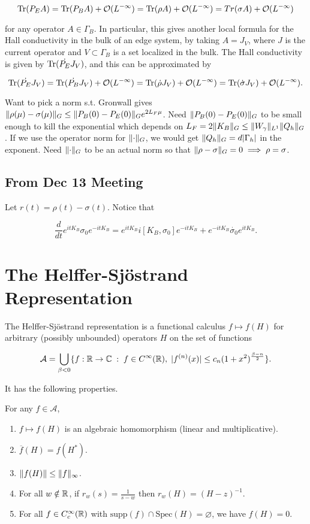 \documentclass[12pt, letterpaper]{article}
\begin{document}
\[\text{Tr}(P_E A) = \text{Tr}(P_B A) + \mathcal{O}(L^{-\infty}) = \text{Tr}(\rho A) + \mathcal{O}(L^{-\infty}) = Tr(\sigma A) + \mathcal{O}(L^{-\infty}) \]

for any operator $A\in\Gamma_B$. In particular, this gives another local formula for the Hall conductivity in the bulk of an edge system, by taking $A = J_V$, where $J$ is the current operator and $V \subset \Gamma_B$ is a set localized in the bulk. The Hall conductivity is given by $\text{Tr}(\dot{P_E}J_V)$, and this can be approximated by

\[\text{Tr}(\dot{P_E} J_V) = \text{Tr}(\dot{P_B} J_V) + \mathcal{O}(L^{-\infty}) = \text{Tr}(\dot{\rho} J_V) + \mathcal{O}(L^{-\infty}) = \text{Tr}(\dot{\sigma} J_V) + \mathcal{O}(L^{-\infty}).\]

Want to pick a norm s.t. Gronwall gives $\lVert \rho(\mu)-\sigma(\mu) \rVert_G \leq \lVert P_B(0)-P_E(0) \rVert_Ge^{2L_F\mu}$. Need $\lVert P_B(0)-P_E(0) \rVert_G$ to be small enough to kill the exponential which depends on $L_F = 2\lVert K_B \rVert_G \leq \lVert W_\gamma \rVert_{L^1}\lVert Q_h \rVert_G$. If we use the operator norm for $\lVert \cdot \rVert_G$, we would get $\lVert Q_h \rVert_G = d|\Gamma_h|$ in the exponent. Need $\lVert \cdot \rVert_G$ to be an actual norm so that $\lVert \rho-\sigma \rVert_G = 0 \implies \rho = \sigma$.

\subsection*{From Dec 13 Meeting}

Let $r(t) = \rho(t)-\sigma(t)$. Notice that 

\[\frac{d}{dt} e^{itK_B}\sigma_0e^{-itK_B} = e^{itK_B}i[K_B,\sigma_0]e^{-itK_B} + e^{-itK_B}\dot{\sigma_0}e^{itK_B}.\]

\section{The Helffer-Sj\"{o}strand Representation}

The Helffer-Sj\"{o}strand representation is a functional calculus $f \mapsto f(H)$ for arbitrary (possibly unbounded) operators $H$ on the set of functions 

\[\mathcal{A} = \bigcup_{\beta<0} \{f:\mathbb{R}\to\mathbb{C} \; : \; f \in C^\infty(\mathbb{R}), \; |f^{(n)}(x)| \leq c_n (1+x^2)^{\frac{\beta-n}{2}}\}.\]

It has the following properties.

\begin{theorem}
For any $f\in \mathcal{A}$,
\begin{enumerate}
\item $f\mapsto f(H)$ is an algebraic homomorphism (linear and multiplicative).
\item $\overline{f}(H) = f(H^*)$.
\item $\lVert f(H) \rVert \leq \lVert f \rVert_\infty$.
\item For all $w \notin \mathbb{R}$, if $r_w(s) = \frac{1}{s-w}$ then $r_w(H) = (H-z)^{-1}$.
\item For all $f \in C^\infty_c(\mathbb{R})$ with $\text{supp}(f) \cap \text{Spec}(H) = \varnothing$, we have $f(H)=0$.
\end{enumerate}
\end{theorem}
\end{document}
